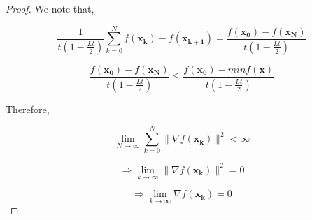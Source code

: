 \documentclass{article}
\begin{document}
\begin{proof}
We note that,

$$\frac{1}{t(1 - \frac{Lt}{2})} \sum_{k=0}^{N} f(\mathbf{x_{k}}) - f(\mathbf{x_{k+1}})=\frac{f(\mathbf{x_{0}}) - f(\mathbf{x_{N}})}{t(1 - \frac{Lt}{2})}$$

$$\frac{f(\mathbf{x_{0}}) - f(\mathbf{x_{N}})}{t(1 - \frac{Lt}{2})} \leq \frac{f(\mathbf{x_{0}}) - minf(\mathbf{x})}{t(1 - \frac{Lt}{2})}$$

Therefore,

$$\lim_{N\to\infty} \sum_{k=0}^{N} \| \nabla f(\mathbf{x_k})\|^2 < \infty$$

$$\Rightarrow\lim_{k\to\infty} \| \nabla f(\mathbf{x_k})\|^2 = 0$$

$$\Rightarrow\lim_{k\to\infty} \nabla f(\mathbf{x_k}) = 0$$
\end{proof}
\end{document}
